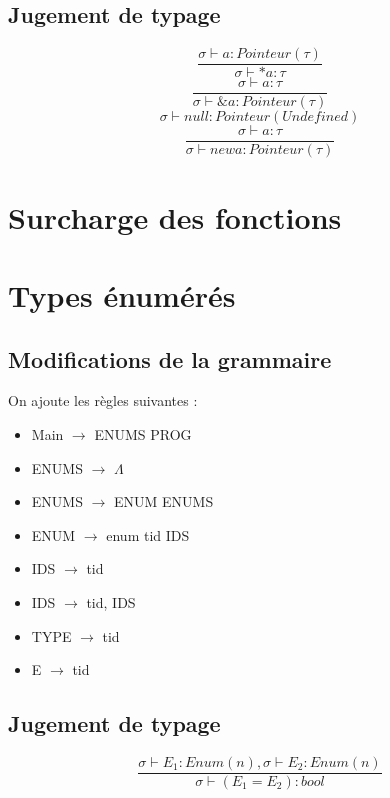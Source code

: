 \documentclass{article}
\begin{document}
\subsection{Jugement de typage}
\begin{equation}
    \frac{\sigma \vdash a : Pointeur(\tau)}{\sigma \vdash * a : \tau}
\end{equation}
\begin{equation}
    \frac{\sigma \vdash a :\tau}{\sigma \vdash \& a : Pointeur(\tau)}
\end{equation}
\begin{equation}
    \sigma \vdash null : Pointeur(Undefined)
\end{equation}
\begin{equation}
    \frac{\sigma \vdash a :\tau}{\sigma \vdash new a : Pointeur(\tau)}
\end{equation}
\section{Surcharge des fonctions}
\section{Types énumérés}
\subsection{Modifications de la grammaire}
On ajoute les règles suivantes :
\begin{itemize}
    \item Main $\rightarrow$ ENUMS PROG
    \item ENUMS $\rightarrow$ $\Lambda$
    \item ENUMS $\rightarrow$ ENUM ENUMS
    \item ENUM $\rightarrow$ enum tid {IDS}
    \item IDS $\rightarrow$ tid
    \item IDS $\rightarrow$ tid, IDS
    \item TYPE $\rightarrow$ tid
    \item E $\rightarrow$ tid
\end{itemize}
\subsection{Jugement de typage}
\begin{equation}
    \frac{\sigma \vdash E_1 : Enum(n), \sigma \vdash E_2 : Enum(n)}{\sigma \vdash (E_1=E_2) : bool}
\end{equation}
\end{document}
